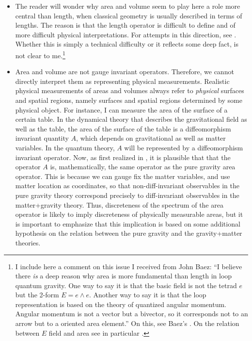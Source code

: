 \documentclass[12pt]{article}
\begin{document}
\begin{itemize}
\begin{itemize}
\item The reader will wonder why area and volume seem to play here a 
role more central than length, when classical geometry is usually 
described in terms of lengths.  The reason is that the length operator 
is difficult to define and of more difficult physical interpretations.  
For attempts in this direction, see \cite{ThiemannLength}.  Whether 
this is simply a technical difficulty or it reflects some deep fact, 
is not clear to me.\footnote{I include here a comment on this issue 
I received from John Baez: ``I believe there {\em is\/} a deep reason
why area is more fundamental than length in loop quantum gravity.  One
way to say it is that the basic field is not the tetrad $e$ but the
2-form $E = e\wedge e$.  Another way to say it is that the loop
representation is based on the theory of quantized angular momentum.
Angular momentum is not a vector but a bivector, so it corresponds not
to an arrow but to a oriented area element.''  On this, see 
Baez's \cite{Baez97}.  On the relation between $E$ field and area see in 
particular \cite{Rovelli93b}.}

	\item Area and volume are not gauge invariant operators.  
	Therefore, we cannot directly interpret them as representing 
	physical measurements.  Realistic physical measurements of 
	areas and volumes always refer to {\em physical\/} surfaces 
	and spatial regions, namely surfaces and spatial regions 
	determined by some physical object.  For instance, I can 
	measure the area of the surface of a certain table.  In the 
	dynamical theory that describes the gravitational field as 
	well as the table, the area of the surface of the table is a 
	diffeomorphism invariant quantity $A$, which depends on 
	gravitational as well as matter variables.  In the quantum 
	theory, $A$ will be represented by a diffeomorphism invariant 
	operator.  Now, as first realized in \cite{RovelliArea}, it 
	is plausible that that the operator $A$ is, mathematically, 
	the same operator as the pure gravity area operator.  This is 
	because we can gauge fix the matter variables, and use matter 
	location as coordinates, so that non-diff-invariant 
	observables in the pure gravity theory correspond precisely 
	to diff-invariant observables in the matter+gravity theory.  
	Thus, discreteness of the spectrum of the area operator is 
	likely to imply discreteness of physically measurable areas, 
	but it is important to emphasize that this implication is 
	based on some additional hypothesis on the relation between 
	the pure gravity and the gravity+matter theories.


\end{itemize}
\end{itemize}
\end{document}
